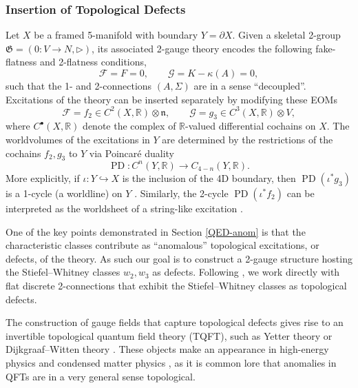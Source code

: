 \documentclass[onecolumn]{article}
\theoremstyle{theorem}
\theoremstyle{remark}
\theoremstyle{example}
\theoremstyle{definition}
\numberwithin{equation}{section}
\begin{document}
\subsubsection{Insertion of Topological Defects}
Let $X$ be a framed 5-manifold with boundary $Y=\partial X$. Given a skeletal 2-group $\mathfrak{G}=(0:V\rightarrow N,\rhd)$, its associated 2-gauge theory encodes the following fake-flatness and 2-flatness conditions,
\begin{equation}
    \mathcal{F} = F = 0,\qquad \mathcal{G} = K -\kappa(A) = 0,\nonumber
\end{equation}
such that the 1- and 2-connections $(A,\Sigma)$ are in a sense ``decoupled''. Excitations of the theory can be inserted separately by modifying these EOMs \cite{Zhu:2019}
\begin{equation}
    \mathcal{F} = f_2 \in C^2(X,\mathbb{R})\otimes\mathfrak{n},\qquad \mathcal{G} = g_3\in C^3(X,\mathbb{R})\otimes V,\nonumber
\end{equation}
where $C^\bullet(X,\mathbb{R})$ denote the complex of $\mathbb{R}$-valued differential cochains on $X$. The worldvolumes  of the excitations in $Y$ are determined by the restrictions of the cochains $f_2,g_3$ to $Y$ via {Poincar{\' e} duality} \cite{book-algtop}
\begin{equation}
    \operatorname{PD}:C^n(Y,\mathbb{R})\rightarrow C_{4-n}(Y,\mathbb{R}).\nonumber
\end{equation}
{More} explicitly, if $\iota:Y\hookrightarrow X$ is the inclusion of the 4D boundary, then $\operatorname{PD}(\iota^*g_3)$ is a 1-cycle (a worldline) on $Y$ \cite{Dubinkin:2020kxo}. Similarly, the 2-cycle $\operatorname{PD}(\iota^* f_2)$ can be interpreted as the worldsheet of a string-like excitation \cite{Zhu:2019,Thorngren2015}.

One of the key points demonstrated in Section \ref{QED-anom} is that the characteristic classes contribute as ``anomalous'' topological excitations, or {defects}, of the theory. As such our goal is to construct a 2-gauge structure hosting the Stiefel--Whitney classes $w_2,w_3$ as defects. Following \cite{Kapustin:2013uxa,Zhu:2019}, we work directly with flat discrete 2-connections that exhibit the Stiefel--Whitney classes as topological defects.


The construction of gauge fields that capture topological defects gives rise to an invertible topological quantum field theory (TQFT), such as Yetter theory \cite{Bullivant:2016clk} or Dijkgraaf--Witten theory \cite{Kapustin:2013uxa,Bullivant:2021}. These objects make an appearance in high-energy physics \cite{Thorngren:2021,Benini_2019} and condensed matter physics \cite{Freed_2021,Kong:2020}, as it is common lore \cite{Freed:2014} that anomalies in QFTs are in a very general sense { {topological}}. 
\end{document}
